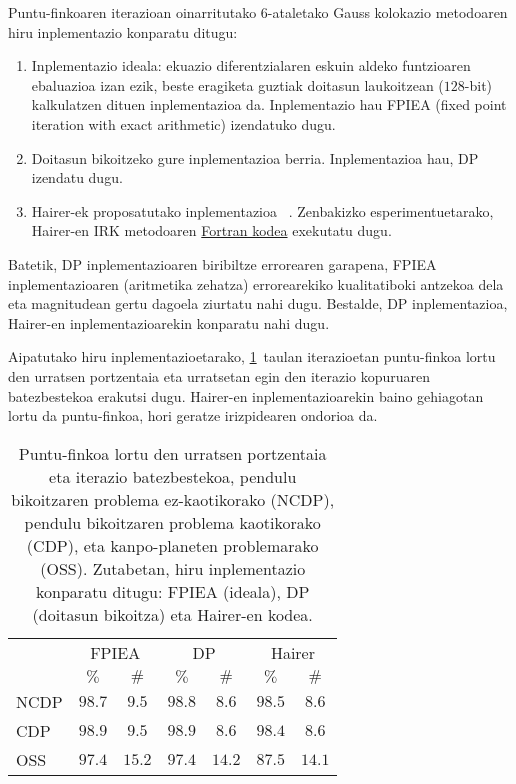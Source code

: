 Puntu-finkoaren iterazioan oinarritutako $6$-ataletako Gauss kolokazio metodoaren hiru inplementazio konparatu ditugu:
\begin{enumerate}
\item Inplementazio ideala: ekuazio diferentzialaren eskuin aldeko funtzioaren ebaluazioa izan ezik, beste eragiketa guztiak doitasun laukoitzean ($128$-bit) kalkulatzen dituen inplementazioa da. Inplementazio hau FPIEA (fixed point iteration with exact arithmetic) izendatuko dugu.

\item Doitasun bikoitzeko gure inplementazioa berria. Inplementazioa hau, DP izendatu dugu.

\item Hairer-ek proposatutako inplementazioa ~\cite{Hairer2008}. Zenbakizko esperimentuetarako, Hairer-en IRK metodoaren \href{http://www.unige.ch/~hairer/preprints.html}{Fortran kodea} exekutatu dugu.     

\end{enumerate}

Batetik, DP inplementazioaren biribiltze errorearen garapena, FPIEA  inplementazioaren (aritmetika zehatza) errorearekiko kualitatiboki antzekoa dela eta magnitudean gertu dagoela ziurtatu nahi dugu. Bestalde, DP inplementazioa, Hairer-en inplementazioarekin konparatu nahi dugu.

Aipatutako hiru inplementazioetarako, \ref{tab:fperr}~taulan iterazioetan puntu-finkoa lortu den urratsen portzentaia eta urratsetan egin den iterazio kopuruaren batezbestekoa erakutsi dugu. Hairer-en inplementazioarekin baino gehiagotan lortu da puntu-finkoa, hori geratze irizpidearen ondorioa da.

\begin{table}
\caption[ Urratsen puntu-fikoaren iterazio portzentaia eta iterazio kopuruaren batezbestekoa.] 
{\small{ Puntu-finkoa lortu den urratsen portzentaia eta iterazio batezbestekoa, pendulu bikoitzaren problema ez-kaotikorako (NCDP), pendulu bikoitzaren problema kaotikorako (CDP), eta kanpo-planeten problemarako (OSS). Zutabetan, hiru inplementazio konparatu ditugu: FPIEA (ideala), DP (doitasun bikoitza) eta Hairer-en kodea.}}
\label{tab:fperr}       %
\centering
{%
\begin{tabular}{ l c c c c c c } 
 \hline
                 &  \multicolumn{2}{c}{FPIEA}  & \multicolumn{2}{c}{DP} & \multicolumn{2}{c}{Hairer} \\
                 &     $\%$        &  $\#$        &      $\%$           &   $\#$      &    $\%$       &  $\#$      \\
 \hline
 NCDP            & $98.7$    & $9.5$   & $98.8$     & $8.6$   &  $98.5$ & $8.6$  \\ 
 CDP             & $98.9$    & $9.5$   & $98.9$     & $8.6$   &  $98.4$ & $8.6$  \\ 
 OSS             & $97.4$    & $15.2$  & $97.4$     & $14.2$  &  $87.5$ & $14.1$ \\ 
   \hline
 \end{tabular}}
 \end{table}


